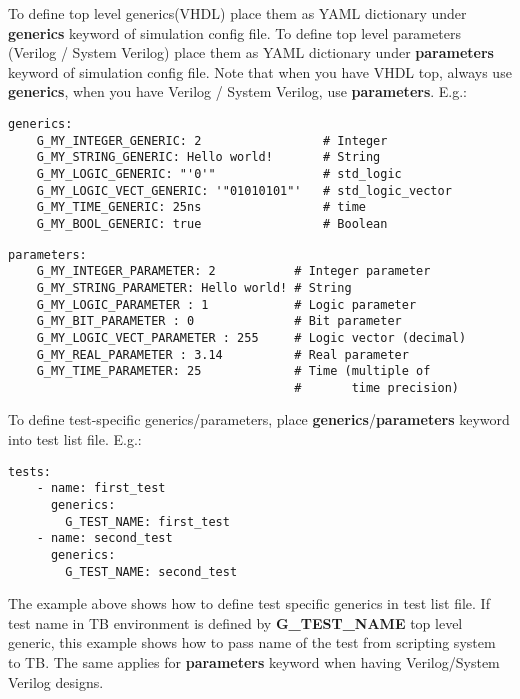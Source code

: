 \documentclass{tropic_design_spec}
\begin{document}
To define top level generics(VHDL) place them as YAML dictionary under \textbf{generics}
keyword of simulation config file. To define top level parameters (Verilog / System Verilog)
place them as YAML dictionary under \textbf{parameters} keyword of simulation config file.
Note that when you have VHDL top, always use \textbf{generics}, when you have Verilog /
System Verilog, use \textbf{parameters}. E.g.:

\begin{lstlisting}
generics:
    G_MY_INTEGER_GENERIC: 2                 # Integer
    G_MY_STRING_GENERIC: Hello world!       # String
    G_MY_LOGIC_GENERIC: "'0'"               # std_logic
    G_MY_LOGIC_VECT_GENERIC: '"01010101"'   # std_logic_vector
    G_MY_TIME_GENERIC: 25ns                 # time
    G_MY_BOOL_GENERIC: true                 # Boolean
\end{lstlisting}

\begin{lstlisting}
parameters:
    G_MY_INTEGER_PARAMETER: 2           # Integer parameter
    G_MY_STRING_PARAMETER: Hello world! # String
    G_MY_LOGIC_PARAMETER : 1            # Logic parameter
    G_MY_BIT_PARAMETER : 0              # Bit parameter
    G_MY_LOGIC_VECT_PARAMETER : 255     # Logic vector (decimal)
    G_MY_REAL_PARAMETER : 3.14          # Real parameter
    G_MY_TIME_PARAMETER: 25             # Time (multiple of
                                        #       time precision)
\end{lstlisting}

\vspace{0.5cm}

To define test-specific generics/parameters, place \textbf{generics}/\textbf{parameters} keyword
into test  list file. E.g.:

\begin{lstlisting}
tests:
    - name: first_test
      generics:
        G_TEST_NAME: first_test
    - name: second_test
      generics:
        G_TEST_NAME: second_test
\end{lstlisting}

The example above shows how to define test specific generics in test list file. If
test name in TB environment is defined by \textbf{G_TEST_NAME} top level generic,
this example shows how to pass name of the test from scripting system to TB. The
same applies for \textbf{parameters} keyword when having Verilog/System Verilog designs.

\end{document}
